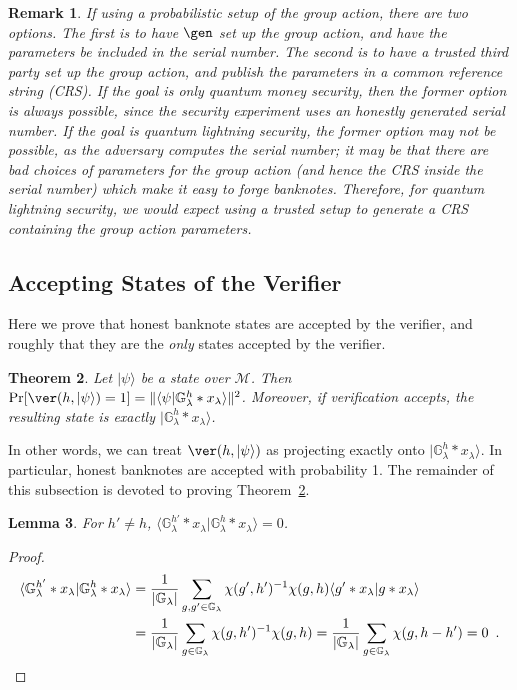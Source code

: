 \documentclass{article}\usepackage[a4paper,margin=20mm]{geometry}
\newtheorem{theorem}{Theorem}\newtheorem{lemma}[theorem]{Lemma}\newtheorem{proposition}[theorem]{Proposition}\newtheorem{corollary}[theorem]{Corollary}\newtheorem{definition}[theorem]{Definition}\newtheorem{claim}[theorem]{Claim}\newtheorem{remark}[theorem]{Remark}\newtheorem{observation}[theorem]{Observation}\newtheorem{conjecture}[theorem]{Conjecture}\newtheorem{example}[theorem]{Example}
\numberwithin{theorem}{section}
\numberwithin{equation}{section}
\newcommand{\G}{\mathbb{G}}
\newcommand{\Ms}{{\mathcal{M}}}
\begin{document}
\begin{remark}If using a probabilistic setup of the group action, there are two options. The first is to have $\gen$ set up the group action, and have the parameters be included in the serial number. The second is to have a trusted third party set up the group action, and publish the parameters in a common reference string (CRS). If the goal is only quantum money security, then the former option is always possible, since the security experiment uses an honestly generated serial number. If the goal is quantum lightning security, the former option may not be possible, as the adversary computes the serial number; it may be that there are bad choices of parameters for the group action (and hence the CRS inside the serial number) which make it easy to forge banknotes. Therefore, for quantum lightning security, we would expect using a trusted setup to generate a CRS containing the group action parameters.
\end{remark}




\subsection{Accepting States of the Verifier}

Here we prove that honest banknote states are accepted by the verifier, and roughly that they are the \emph{only} states accepted by the verifier.

\begin{theorem}\label{thm:reject} Let $|\psi\rangle$ be a state over $\Ms$. Then $\Pr[\ver(h,|\psi\rangle)=1]=\|\langle\psi |\G_\lambda^h*x_\lambda\rangle \|^2$. Moreover, if verification accepts, the resulting state is exactly $|\G_\lambda^h*x_\lambda\rangle$.
\end{theorem}
In other words, we can treat $\ver(h,|\psi\rangle)$ as projecting exactly onto $|\G_\lambda^h*x_\lambda\rangle$. In particular, honest banknotes are accepted with probability 1. The remainder of this subsection is devoted to proving Theorem~\ref{thm:reject}.

\begin{lemma}For $h'\neq h$, $\langle \G_\lambda^{h'}*x_\lambda|\G_\lambda^h*x_\lambda\rangle=0$.
\end{lemma}
\begin{proof} 
	\begin{align*}
		\langle \G_\lambda^{h'}*x_\lambda|\G_\lambda^h*x_\lambda\rangle&=\frac{1}{|\G_\lambda|}\sum_{g,g'\in\G_\lambda}\chi(g',h')^{-1}\chi(g,h)\langle g'*x_\lambda|g*x_\lambda\rangle\\
		&=\frac{1}{|\G_\lambda|}\sum_{g\in\G_\lambda}\chi(g,h')^{-1}\chi(g,h)=\frac{1}{|\G_\lambda|}\sum_{g\in\G_\lambda}\chi(g,h-h')=0\enspace .\qedhere
	\end{align*}
\end{proof}
\end{document}
